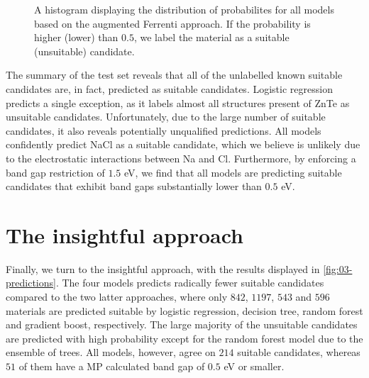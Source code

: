 \begin{figure}[ht!]
    \centering
    
    \vspace*{-130mm}
    \caption{A histogram displaying the distribution of probabilites for all models based on the augmented Ferrenti approach. If the probability is higher (lower) than $0.5$, we label the material as a suitable (unsuitable) candidate.}
    \label{fig:histogram-augmented-ferrenti}
\end{figure}

The summary of the test set reveals that all of the unlabelled known suitable candidates are, in fact, predicted as suitable candidates. Logistic regression predicts a single exception, as it labels almost all structures present of ZnTe as unsuitable candidates. Unfortunately, due to the large number of suitable candidates, it also reveals potentially unqualified predictions. All models confidently predict NaCl as a suitable candidate, which we believe is unlikely due to the electrostatic interactions between Na and Cl. Furthermore, by enforcing a band gap restriction of $1.5$ eV, we find that all models are predicting suitable candidates that exhibit band gaps substantially lower than $0.5$ eV.



\section{The insightful approach}

Finally, we turn to the insightful approach, with the results displayed in \autoref{fig:03-predictions}. The four models predicts radically fewer suitable candidates compared to the two latter approaches, where only $842$, $1197$, $543$ and $596$ materials are predicted suitable by logistic regression, decision tree, random forest and gradient boost, respectively. The large majority of the unsuitable candidates are predicted with high probability except for the random forest model due to the ensemble of trees. All models, however, agree on $214$ suitable candidates, whereas $51$ of them have a MP calculated band gap of $0.5$ eV or smaller. 


